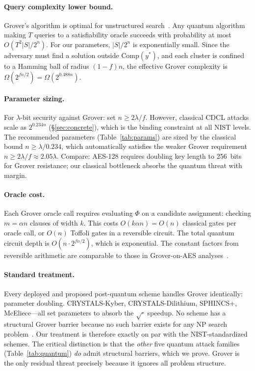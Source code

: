 \documentclass[11pt]{article}
\begin{document}
\paragraph{Query complexity lower bound.}
Grover's algorithm is optimal for unstructured search~\cite{BBBV97,Zal99}.  Any quantum algorithm making $T$ queries to a satisfiability oracle succeeds with probability at most $O(T^2 |S| / 2^n)$.  For our parameters, $|S|/2^n$ is exponentially small.  Since the adversary must find a solution outside $\mathrm{Comp}(y^*)$, and each cluster is confined to a Hamming ball of radius $(1-f)n$, the effective Grover complexity is $\Omega(2^{fn/2}) = \Omega(2^{0.488n})$.

\paragraph{Parameter sizing.}
For $\lambda$-bit security against Grover: set $n \geq 2\lambda/f$.  However, classical CDCL attacks scale as $2^{0.234n}$ (\S\ref{sec:concrete}), which is the binding constraint at all NIST levels.  The recommended parameters (Table~\ref{tab:params}) are sized by the classical bound $n \geq \lambda / 0.234$, which automatically satisfies the weaker Grover requirement $n \geq 2\lambda / f \approx 2.05\lambda$.  Compare: AES-128 requires doubling key length to 256~bits for Grover resistance; our classical bottleneck absorbs the quantum threat with margin.

\paragraph{Oracle cost.}
Each Grover oracle call requires evaluating $\Phi$ on a candidate assignment: checking $m = \alpha n$ clauses of width $k$.  This costs $O(k \alpha n) = O(n)$ classical gates per oracle call, or $O(n)$ Toffoli gates in a reversible circuit.  The total quantum circuit depth is $O(n \cdot 2^{fn/2})$, which is exponential.  The constant factors from reversible arithmetic are comparable to those in Grover-on-AES analyses~\cite{GLRS16}.

\paragraph{Standard treatment.}
Every deployed and proposed post-quantum scheme handles Grover identically: parameter doubling.  CRYSTALS-Kyber, CRYSTALS-Dilithium, SPHINCS+, McEliece---all set parameters to absorb the $\sqrt{\cdot}$ speedup.  No scheme has a structural Grover barrier because no such barrier exists for any NP search problem~\cite{BBBV97}.  Our treatment is therefore exactly on par with the NIST-standardized schemes.  The critical distinction is that the \emph{other} five quantum attack families (Table~\ref{tab:quantum}) \emph{do} admit structural barriers, which we prove.  Grover is the only residual threat precisely because it ignores all problem structure.
\end{document}

